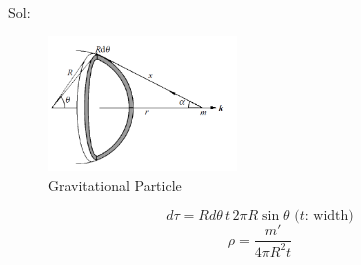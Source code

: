 \documentclass[11pt, a4paper, oneside]{book}
\numberwithin{equation}{section}%
\begin{document}
~\\
Sol:

\begin{figure}[H]
	\centering
	\includegraphics[width=5cm]{Gravitation_1}
	\caption{Gravitational Particle}
	\label{gravitation1}
\end{figure}

 $$d\tau = Rd\theta\,t\,2\pi R\sin\theta \text{ ($t$: width)}$$
 $$\rho = \frac{m'}{4\pi R^2 t}$$
 
\end{document}
